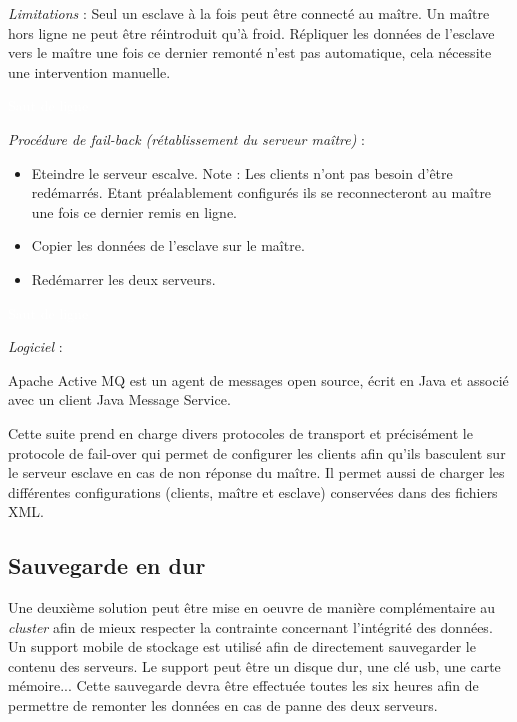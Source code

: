 \textit{Limitations} :
Seul un esclave à la fois peut être connecté au maître.
Un maître hors ligne ne peut être réintroduit qu'à froid.
Répliquer les données de l'esclave vers le maître une fois ce dernier remonté n'est pas automatique, cela nécessite une intervention manuelle.

\textcolor{white}{Saut de ligne} 

\textit{Procédure de fail-back (rétablissement du serveur maître)} :
\begin{itemize}
\item Eteindre le serveur escalve.
Note : Les clients n'ont pas besoin d'être redémarrés. Etant préalablement configurés ils se reconnecteront au maître une fois ce dernier remis en ligne.
\item Copier les données de l'esclave sur le maître.
\item Redémarrer les deux serveurs.
\end{itemize}

\textcolor{white}{Saut de ligne}

\textit{Logiciel} :

Apache Active MQ est un agent de messages open source, écrit en Java et associé avec un client Java Message Service. 

Cette suite prend en charge divers protocoles de transport et précisément le protocole de fail-over qui permet de configurer les clients afin qu'ils basculent sur le serveur esclave en cas de non réponse du maître. 
Il permet aussi de charger les différentes configurations (clients, maître et esclave) conservées dans des fichiers XML. 

\subsection{Sauvegarde en dur}

Une deuxième solution peut être mise en oeuvre de manière complémentaire au \textit{cluster} afin de mieux respecter la contrainte concernant l'intégrité des données.
Un support mobile de stockage est utilisé afin de directement sauvegarder le contenu des serveurs. Le support peut être un disque dur, une clé usb, une carte mémoire... 
Cette sauvegarde devra être effectuée toutes les six heures afin de permettre de remonter les données en cas de panne des deux serveurs.  
